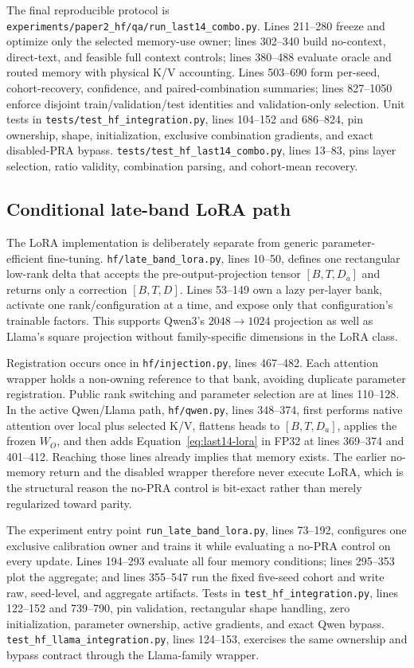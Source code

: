 \documentclass[11pt]{article}
\begin{document}
The final reproducible protocol is
\texttt{experiments/paper2\_hf/qa/run\_last14\_combo.py}. Lines 211--280 freeze and optimize only
the selected memory-use owner; lines 302--340 build no-context, direct-text, and feasible full
context controls; lines 380--488 evaluate oracle and routed memory with physical K/V accounting.
Lines 503--690 form per-seed, cohort-recovery, confidence, and paired-combination summaries;
lines 827--1050 enforce disjoint train/validation/test identities and validation-only selection.
Unit tests in \texttt{tests/test\_hf\_integration.py}, lines 104--152 and 686--824, pin ownership,
shape, initialization, exclusive combination gradients, and exact disabled-PRA bypass.
\texttt{tests/test\_hf\_last14\_combo.py}, lines 13--83, pins layer selection, ratio validity,
combination parsing, and cohort-mean recovery.

\subsection{Conditional late-band LoRA path}

The LoRA implementation is deliberately separate from generic parameter-efficient fine-tuning.
\texttt{hf/late\_band\_lora.py}, lines 10--50, defines one rectangular low-rank delta that
accepts the pre-output-projection tensor $[B,T,D_a]$ and returns only a correction
$[B,T,D]$. Lines 53--149 own a lazy per-layer bank, activate one rank/configuration at a time,
and expose only that configuration's trainable factors. This supports Qwen3's $2048\rightarrow
1024$ projection as well as Llama's square projection without family-specific dimensions in the
LoRA class.

Registration occurs once in \texttt{hf/injection.py}, lines 467--482. Each attention wrapper
holds a non-owning reference to that bank, avoiding duplicate parameter registration. Public
rank switching and parameter selection are at lines 110--128. In the active Qwen/Llama path,
\texttt{hf/qwen.py}, lines 348--374, first performs native attention over local plus selected K/V,
flattens heads to $[B,T,D_a]$, applies the frozen $W_O$, and then adds
Equation~\ref{eq:last14-lora} in FP32 at lines 369--374 and 401--412. Reaching those lines already
implies that memory exists. The earlier no-memory return and
the disabled wrapper therefore never execute LoRA, which is the structural reason the no-PRA
control is bit-exact rather than merely regularized toward parity.

The experiment entry point \texttt{run\_late\_band\_lora.py}, lines 73--192, configures one
exclusive calibration owner and trains it while evaluating a no-PRA control on every update.
Lines 194--293 evaluate all four memory conditions; lines 295--353 plot the aggregate; and lines
355--547 run the fixed five-seed cohort and write raw, seed-level, and aggregate artifacts. Tests
in \texttt{test\_hf\_integration.py}, lines 122--152 and 739--790, pin validation, rectangular
shape handling, zero initialization, parameter ownership, active gradients, and exact Qwen
bypass. \texttt{test\_hf\_llama\_integration.py}, lines 124--153, exercises the same ownership
and bypass contract through the Llama-family wrapper.
\end{document}
